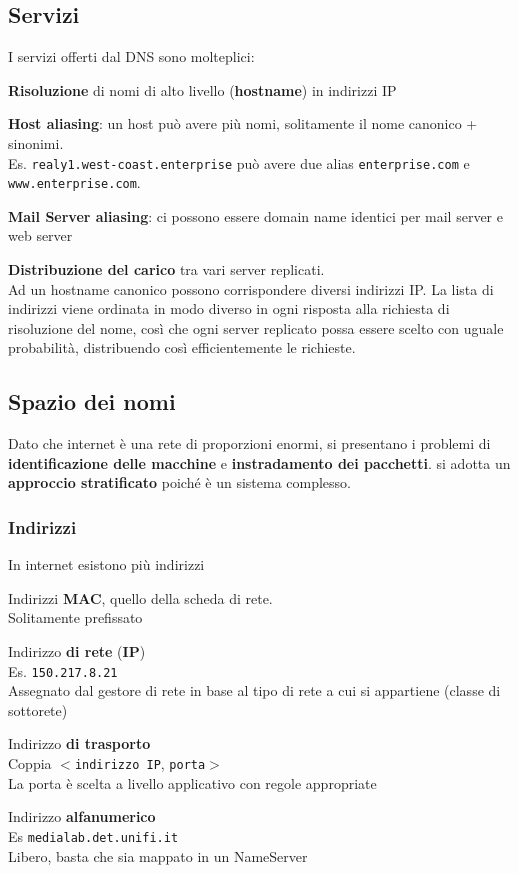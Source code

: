 \documentclass[10pt]{article}
\begin{document}
\subsection{Servizi}
I servizi offerti dal DNS sono molteplici:
\begin{list}{}{}
\item \textbf{Risoluzione} di nomi di alto livello (\textbf{hostname}) in indirizzi IP
\item \textbf{Host aliasing}: un host può avere più nomi, solitamente il nome canonico + sinonimi.\\
Es. \texttt{realy1.west-coast.enterprise} può avere due alias \texttt{enterprise.com} e \texttt{www.enterprise.com}.
\item \textbf{Mail Server aliasing}: ci possono essere domain name identici per mail server e web server
\item \textbf{Distribuzione del carico} tra vari server replicati.\\
Ad un hostname canonico possono corrispondere diversi indirizzi IP. La lista di indirizzi viene ordinata in modo diverso in ogni risposta alla richiesta di risoluzione del nome, così che ogni server replicato possa essere scelto con uguale probabilità, distribuendo così efficientemente le richieste.
\end{list}
\subsection{Spazio dei nomi}
Dato che internet è una rete di proporzioni enormi, si presentano i problemi di \textbf{identificazione delle macchine} e \textbf{instradamento dei pacchetti}. si adotta un \textbf{approccio stratificato} poiché è un sistema complesso.\\
\subsubsection{Indirizzi} In internet esistono più indirizzi
\begin{list}{}{}
\item Indirizzi \textbf{MAC}, quello della scheda di rete.\\Solitamente prefissato
\item Indirizzo \textbf{di rete} (\textbf{IP})\\Es. \texttt{150.217.8.21}\\Assegnato dal gestore di rete in base al tipo di rete a cui si appartiene (classe di sottorete)
\item Indirizzo \textbf{di trasporto}\\Coppia $<$\texttt{indirizzo IP}, \texttt{porta}$>$\\La porta è scelta a livello applicativo con regole appropriate
\item Indirizzo \textbf{alfanumerico}\\Es \texttt{medialab.det.unifi.it}\\Libero, basta che sia mappato in un NameServer
\end{list}
\end{document}
